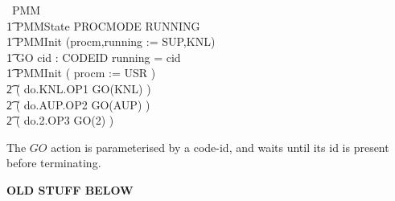 \begin{circus}
\circprocess\ PMM \circdef \circbegin \\
\t1 \circstate PMMState  PROCMODE \land RUNNING \\
\t1 PMMInit \circdef (procm,running := SUP,KNL) \\
\t1 GO \circdef
   \circval cid : CODEID \circspot
      \lcircguard running = cid \rcircguard \circguard \Skip \\
\t1 \circspot PMMInit \circseq
               ( procm := USR ) \\
\t2 \circseq ( do.KNL.OP1 \then GO(KNL) ) \\
\t2 \circseq ( do.AUP.OP2 \then GO(AUP) ) \\
\t2 \circseq ( do.2.OP3 \then GO(2) )\\
\circend
\end{circus}

The $GO$ action is parameterised by a code-id,
and waits until its id is present before terminating.


\newpage
\textbf{OLD STUFF BELOW}

